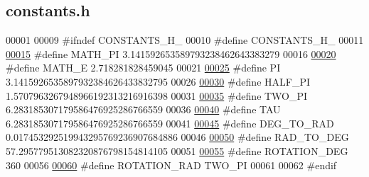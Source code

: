 \hypertarget{constants_8h_source}{}\subsection{constants.\+h}
\label{constants_8h_source}

\begin{DoxyCode}
00001 
00009 \textcolor{preprocessor}{#ifndef CONSTANTS\_H\_}
00010 \textcolor{preprocessor}{#define CONSTANTS\_H\_}
00011 
\hypertarget{constants_8h_source.tex_l00015}{}\hyperlink{constants_8h_ac58cbaeae310f551049f77b7c098599e}{00015} \textcolor{preprocessor}{#define MATH\_PI 3.141592653589793238462643383279}
00016 
\hypertarget{constants_8h_source.tex_l00020}{}\hyperlink{constants_8h_a9ee56816d83d03ce2644259a848f0ecb}{00020} \textcolor{preprocessor}{#define MATH\_E 2.718281828459045}
00021 
\hypertarget{constants_8h_source.tex_l00025}{}\hyperlink{constants_8h_a598a3330b3c21701223ee0ca14316eca}{00025} \textcolor{preprocessor}{#define PI 3.1415926535897932384626433832795}
00026 
\hypertarget{constants_8h_source.tex_l00030}{}\hyperlink{constants_8h_ae3ec3219e4eee3b0992bfd59c2e2bc42}{00030} \textcolor{preprocessor}{#define HALF\_PI 1.5707963267948966192313216916398}
00031 
\hypertarget{constants_8h_source.tex_l00035}{}\hyperlink{constants_8h_a3b947f4b635461030ff2d87833e5049e}{00035} \textcolor{preprocessor}{#define TWO\_PI 6.283185307179586476925286766559}
00036 
\hypertarget{constants_8h_source.tex_l00040}{}\hyperlink{constants_8h_a3d8c9c145887af5174ba4cc6789862ad}{00040} \textcolor{preprocessor}{#define TAU 6.283185307179586476925286766559}
00041 
\hypertarget{constants_8h_source.tex_l00045}{}\hyperlink{constants_8h_a212460e743fecb084d717bb2180c5a56}{00045} \textcolor{preprocessor}{#define DEG\_TO\_RAD 0.017453292519943295769236907684886}
00046 
\hypertarget{constants_8h_source.tex_l00050}{}\hyperlink{constants_8h_a89e47af0449640d4f15191aba5ca24c6}{00050} \textcolor{preprocessor}{#define RAD\_TO\_DEG 57.295779513082320876798154814105}
00051 
\hypertarget{constants_8h_source.tex_l00055}{}\hyperlink{constants_8h_af5a74308a3fd418c13af67f9319e5308}{00055} \textcolor{preprocessor}{#define ROTATION\_DEG 360}
00056 
\hypertarget{constants_8h_source.tex_l00060}{}\hyperlink{constants_8h_a37117cb56189209203e067fd2e196589}{00060} \textcolor{preprocessor}{#define ROTATION\_RAD TWO\_PI}
00061 
00062 \textcolor{preprocessor}{#endif}
\end{DoxyCode}
